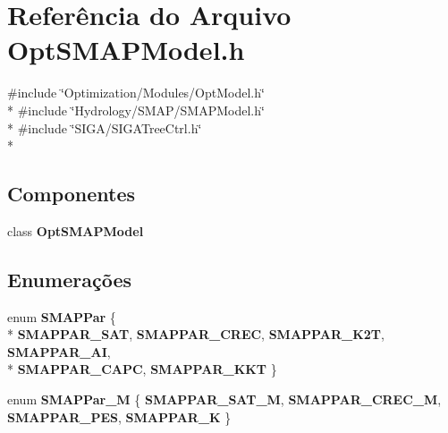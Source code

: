\section{Referência do Arquivo Opt\+S\+M\+A\+P\+Model.\+h}
\label{_opt_s_m_a_p_model_8h}
{\ttfamily \#include \char`\"{}Optimization/\+Modules/\+Opt\+Model.\+h\char`\"{}}\\*
{\ttfamily \#include \char`\"{}Hydrology/\+S\+M\+A\+P/\+S\+M\+A\+P\+Model.\+h\char`\"{}}\\*
{\ttfamily \#include \char`\"{}S\+I\+G\+A/\+S\+I\+G\+A\+Tree\+Ctrl.\+h\char`\"{}}\\*
\subsection*{Componentes}
\begin{DoxyCompactItemize}
\item 
class {\bf Opt\+S\+M\+A\+P\+Model}
\end{DoxyCompactItemize}
\subsection*{Enumerações}
\begin{DoxyCompactItemize}
\item 
enum {\bf S\+M\+A\+P\+Par} \{ \\*
{\bf S\+M\+A\+P\+P\+A\+R\+\_\+\+S\+AT}, 
{\bf S\+M\+A\+P\+P\+A\+R\+\_\+\+C\+R\+EC}, 
{\bf S\+M\+A\+P\+P\+A\+R\+\_\+\+K2T}, 
{\bf S\+M\+A\+P\+P\+A\+R\+\_\+\+AI}, 
\\*
{\bf S\+M\+A\+P\+P\+A\+R\+\_\+\+C\+A\+PC}, 
{\bf S\+M\+A\+P\+P\+A\+R\+\_\+\+K\+KT}
 \}
\item 
enum {\bf S\+M\+A\+P\+Par\+\_\+M} \{ {\bf S\+M\+A\+P\+P\+A\+R\+\_\+\+S\+A\+T\+\_\+M}, 
{\bf S\+M\+A\+P\+P\+A\+R\+\_\+\+C\+R\+E\+C\+\_\+M}, 
{\bf S\+M\+A\+P\+P\+A\+R\+\_\+\+P\+ES}, 
{\bf S\+M\+A\+P\+P\+A\+R\+\_\+K}
 \}
\end{DoxyCompactItemize}
